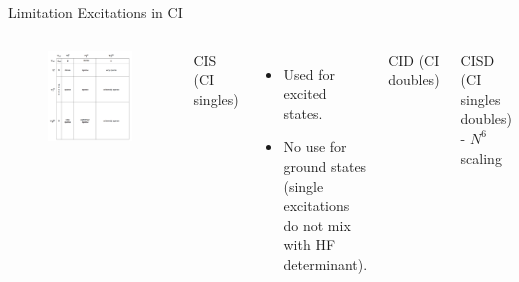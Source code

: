 \documentclass[aspectratio=169]{beamer}
\begin{document}
\begin{frame}{Limitation Excitations in CI}
\begin{columns}
\begin{figure}
    \centering
    \includegraphics[width=0.8\linewidth]{lectures/figures/3_CI_excitations.png}
\end{figure}
CIS (CI singles)
\begin{itemize}
    \item Used for excited states.
    \item No use for ground states (single excitations do not mix with HF determinant).
\end{itemize}

CID (CI doubles)

CISD (CI singles doubles) - $N^6$ scaling

\end{columns}

\end{frame}
\end{document}
